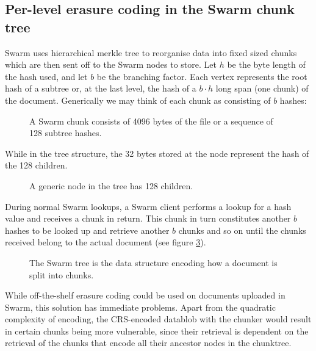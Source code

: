 \subsection{Per-level erasure coding in the Swarm chunk tree \statusgreen}

Swarm uses hierarchical merkle tree \cite{merkle1980protocols} to reorganise data into fixed sized chunks which are then sent off to the Swarm nodes to store.
Let $h$ be the byte length of the hash used, and let $b$ be the branching factor. Each vertex represents the root hash of a subtree or, at the last level, the hash of a $b\cdot h$ long span (one chunk) of the document. Generically we may think of each chunk as consisting of $b$ hashes:


\begin{figure}[htbp]
   \centering
   
   \caption[Swarm chunk \statusgreen]{A Swarm chunk consists of 4096 bytes of the file or a sequence of 128 subtree hashes.}
   \label{fig:chunk}
\end{figure}

While in the tree structure, the 32 bytes stored at the node represent the hash of the 128 children.

\begin{figure}[htbp]
   \centering
   
   \caption[A generic node in the tree has 128 children \statusgreen]{A generic node in the tree has 128 children.}
   \label{fig:Swarm-hash-basic}
\end{figure}

During normal Swarm lookups, a Swarm client performs a lookup for a hash value and receives a chunk in return. This chunk in turn constitutes another $b$ hashes to be looked up and retrieve another $b$ chunks and so on until the chunks received belong to the actual document (see figure \ref{fig:Swarm-hash-split}).


\begin{figure}[htbp]
   \centering
   
   \caption[Swarm hash split \statusgreen]{The Swarm tree is the data structure encoding how a document is split into chunks.}
   \label{fig:Swarm-hash-split}
\end{figure}

While off-the-shelf erasure coding could be used on documents uploaded in Swarm, this solution has immediate problems. Apart from the quadratic complexity of encoding,  the CRS-encoded datablob with the chunker would result in certain chunks being more vulnerable, since their retrieval is dependent on the retrieval of the chunks that encode all their ancestor nodes in the chunktree.

